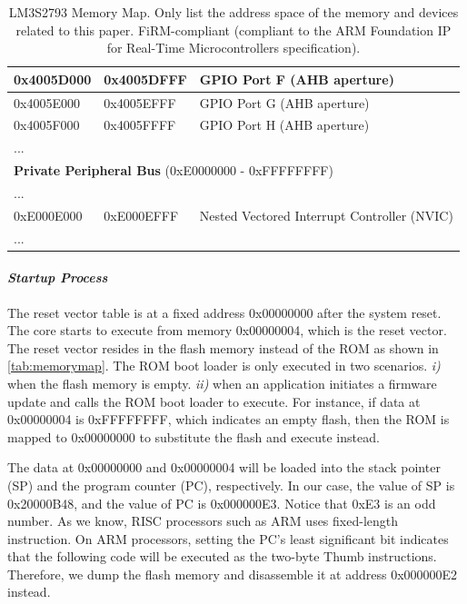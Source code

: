 \begin{center}
\begin{table}
\begin{tabular}{p{1.6cm}  p{1.6cm}  p{4cm}}
			\hline
			0x4005D000 & 0x4005DFFF & GPIO Port F (AHB aperture) \\
			\hline
			0x4005E000 & 0x4005EFFF & GPIO Port G (AHB aperture) \\
			\hline
			0x4005F000 & 0x4005FFFF & GPIO Port H (AHB aperture) \\
			\hline
			... & & \\
			\hline
			\multicolumn{3}{l}{\textbf{Private Peripheral Bus} (0xE0000000 - 0xFFFFFFFF)}  \\
			\hline
			... & & \\
			\hline
			0xE000E000 & 0xE000EFFF & Nested Vectored Interrupt Controller (NVIC) \\
			\hline
			... & & \\
			\hline
		\end{tabular}
		\caption{LM3S2793 Memory Map. Only list the address space of the memory and devices related to this paper. FiRM-compliant (compliant to the ARM Foundation IP for Real-Time Microcontrollers specification).}
		\label{tab:memorymap}
	\end{table}
\end{center}


\paragraph{\textbf{\textit{Startup Process}}} The reset vector table is at a fixed address 0x00000000 after the system reset. The core starts to execute from memory 0x00000004, which is the reset vector. The reset vector resides in the flash memory instead of the ROM as shown in \autoref{tab:memorymap}. The ROM boot loader is only executed in two scenarios. \textit{i)} when the flash memory is empty. \textit{ii)} when an application initiates a firmware update and calls the ROM boot loader to execute. For instance, if data at 0x00000004 is 0xFFFFFFFF, which indicates an empty flash, then the ROM is mapped to 0x00000000 to substitute the flash and execute instead. 

The data at 0x00000000 and 0x00000004 will be loaded into the stack pointer (SP) and the program counter (PC), respectively. In our case, the value of SP is 0x20000B48, and the value of PC is 0x000000E3. Notice that 0xE3 is an odd number. As we know, RISC processors such as ARM uses fixed-length instruction. On ARM processors, setting the PC's least significant bit indicates that the following code will be executed as the two-byte Thumb instructions. Therefore, we dump the flash memory and disassemble it at address 0x000000E2 instead.


